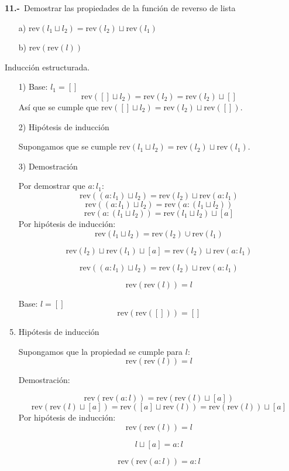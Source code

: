 \textbf{11.-}\ Demostrar las propiedades de la función de reverso de lista


\begin{itemize}
    \item[a)] $\text{rev}(l_1 \sqcup l_2) = \text{rev}(l_2) \sqcup \text{rev}(l_1)$
    \item[b)] $\text{rev}(\text{rev}(l))$
\end{itemize}

Inducción estructurada.

\begin{enumerate}
    \item[1)] Base: $l_1 = []$
    \[
    \text{rev}([] \sqcup l_2) = \text{rev}(l_2) = \text{rev}(l_2) \sqcup []
    \]
    Así que se cumple que $\text{rev}([] \sqcup l_2) = \text{rev}(l_2) \sqcup \text{rev}([])$.

    \item[2)] Hipótesis de inducción

    Supongamos que se cumple $\text{rev}(l_1 \sqcup l_2) = \text{rev}(l_2) \sqcup \text{rev}(l_1)$.

    \item[3)] Demostración

    Por demostrar que $a : l_1$:
    \[
    \text{rev}((a : l_1) \sqcup l_2) = \text{rev}(l_2) \sqcup \text{rev}(a : l_1)
    \]
    \[
    \text{rev}((a : l_1) \sqcup l_2) = \text{rev}(a : (l_1 \sqcup l_2))
    \]
    \[
    \text{rev}(a : (l_1 \sqcup l_2)) = \text{rev}(l_1 \sqcup l_2) \sqcup [a]
    \]
    Por hipótesis de inducción:
    \[
    \text{rev}(l_1 \sqcup l_2) = \text{rev}(l_2) \cup \text{rev}(l_1)
    \]

    \[
    \text{rev}(l_2) \sqcup \text{rev}(l_1) \sqcup [a] = \text{rev}(l_2) \sqcup \text{rev}(a : l_1)
    \]
    
    \[
    \text{rev}((a : l_1) \sqcup l_2) = \text{rev}(l_2) \sqcup \text{rev}(a : l_1)
    \]

    \[
    \text{rev}(\text{rev}(l)) = l
    \]
    \item[Base:] $l = []$
    \[
    \text{rev}(\text{rev}([])) = []
    \]

    \item Hipótesis de inducción

    Supongamos que la propiedad se cumple para $l$:
    \[
    \text{rev}(\text{rev}(l)) = l
    \]

    \item[Demostración:]

    \[
    \text{rev}(\text{rev}(a : l)) = \text{rev}(\text{rev}(l) \sqcup [a])
    \]
    \[
    \text{rev}(\text{rev}(l) \sqcup [a]) = \text{rev}([a] \sqcup \text{rev}(l)) = \text{rev}(\text{rev}(l)) \sqcup [a]
    \]
    Por hipótesis de inducción:
    \[
    \text{rev}(\text{rev}(l)) = l
    \]

    \[
    l \sqcup [a] = a : l
    \]

    \[
    \text{rev}(\text{rev}(a : l)) = a : l
    \]
\end{enumerate}

